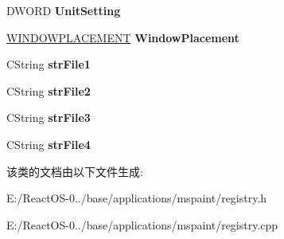 \begin{DoxyCompactItemize}
\mbox{\label{class_registry_settings_a068f59e31b8289e118130fbbd4b98063}} 
D\+W\+O\+RD {\bfseries Unit\+Setting}
\item 
\mbox{\label{class_registry_settings_ab4f59ae6a17859627566a17e1bb3cae7}} 
\hyperlink{struct___w_i_n_d_o_w_p_l_a_c_e_m_e_n_t}{W\+I\+N\+D\+O\+W\+P\+L\+A\+C\+E\+M\+E\+NT} {\bfseries Window\+Placement}
\item 
\mbox{\label{class_registry_settings_aac23f208542df2a0a7888e2fccc13eda}} 
C\+String {\bfseries str\+File1}
\item 
\mbox{\label{class_registry_settings_a69ba3b3e787e68ec81f33749ae432114}} 
C\+String {\bfseries str\+File2}
\item 
\mbox{\label{class_registry_settings_afb6d4b869c264c466c04d13510c196d8}} 
C\+String {\bfseries str\+File3}
\item 
\mbox{\label{class_registry_settings_a0a3a397d3d224bbbacd9d76fb76cae38}} 
C\+String {\bfseries str\+File4}
\end{DoxyCompactItemize}


该类的文档由以下文件生成\+:\begin{DoxyCompactItemize}
\item 
E\+:/\+React\+O\+S-\/0../base/applications/mspaint/registry.\+h\item 
E\+:/\+React\+O\+S-\/0../base/applications/mspaint/registry.\+cpp\end{DoxyCompactItemize}
